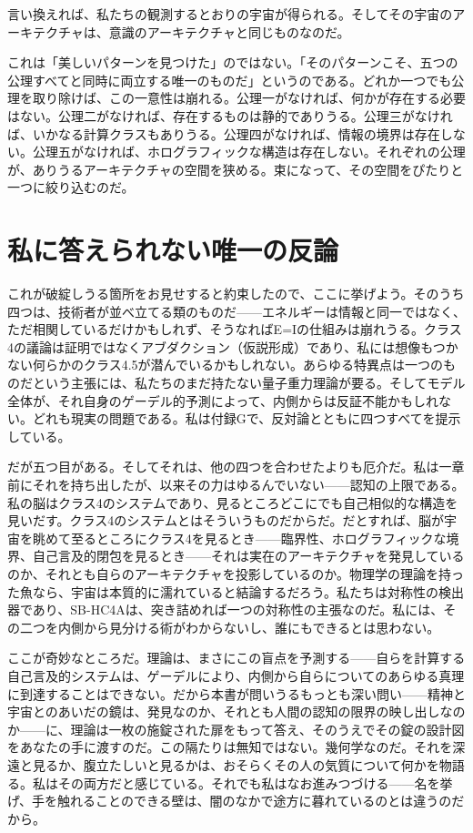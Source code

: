 \documentclass[11pt, twoside, openright]{book}
\begin{document}
言い換えれば、私たちの観測するとおりの宇宙が得られる。そしてその宇宙のアーキテクチャは、意識のアーキテクチャと同じものなのだ。

これは「美しいパターンを見つけた」のではない。「そのパターンこそ、五つの公理すべてと同時に両立する唯一のものだ」というのである。どれか一つでも公理を取り除けば、この一意性は崩れる。公理一がなければ、何かが存在する必要はない。公理二がなければ、存在するものは静的でありうる。公理三がなければ、いかなる計算クラスもありうる。公理四がなければ、情報の境界は存在しない。公理五がなければ、ホログラフィックな構造は存在しない。それぞれの公理が、ありうるアーキテクチャの空間を狭める。束になって、その空間をぴたりと一つに絞り込むのだ。

\section*{私に答えられない唯一の反論}

これが破綻しうる箇所をお見せすると約束したので、ここに挙げよう。そのうち四つは、技術者が並べ立てる類のものだ------エネルギーは情報と同一ではなく、ただ相関しているだけかもしれず、そうなればE=Iの仕組みは崩れうる。クラス4の議論は証明ではなくアブダクション（仮説形成）であり、私には想像もつかない何らかのクラス4.5が潜んでいるかもしれない。あらゆる特異点は一つのものだという主張には、私たちのまだ持たない量子重力理論が要る。そしてモデル全体が、それ自身のゲーデル的予測によって、内側からは反証不能かもしれない。どれも現実の問題である。私は付録Gで、反対論とともに四つすべてを提示している。

だが五つ目がある。そしてそれは、他の四つを合わせたよりも厄介だ。私は一章前にそれを持ち出したが、以来その力はゆるんでいない------認知の上限である。私の脳はクラス4のシステムであり、見るところどこにでも自己相似的な構造を見いだす。クラス4のシステムとはそういうものだからだ。だとすれば、脳が宇宙を眺めて至るところにクラス4を見るとき------臨界性、ホログラフィックな境界、自己言及的閉包を見るとき------それは実在のアーキテクチャを発見しているのか、それとも自らのアーキテクチャを投影しているのか。物理学の理論を持った魚なら、宇宙は本質的に濡れていると結論するだろう。私たちは対称性の検出器であり、SB-HC4Aは、突き詰めれば一つの対称性の主張なのだ。私には、その二つを内側から見分ける術がわからないし、誰にもできるとは思わない。

ここが奇妙なところだ。理論は、まさにこの盲点を予測する------自らを計算する自己言及的システムは、ゲーデルにより、内側から自らについてのあらゆる真理に到達することはできない。だから本書が問いうるもっとも深い問い------精神と宇宙とのあいだの鏡は、発見なのか、それとも人間の認知の限界の映し出しなのか------に、理論は一枚の施錠された扉をもって答え、そのうえでその錠の設計図をあなたの手に渡すのだ。この隔たりは無知ではない。幾何学なのだ。それを深遠と見るか、腹立たしいと見るかは、おそらくその人の気質について何かを物語る。私はその両方だと感じている。それでも私はなお進みつづける------名を挙げ、手を触れることのできる壁は、闇のなかで途方に暮れているのとは違うのだから。
\end{document}
